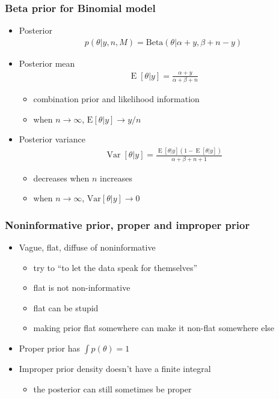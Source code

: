 \documentclass[english,t]{beamer}
\DeclareMathOperator{\E}{E}
\DeclareMathOperator{\Var}{Var}
\begin{document}
\begin{frame}
  \frametitle{Beta prior for Binomial model}

  \begin{itemize}
  \item Posterior
    \baselineskip
    \begin{align*}
      p(\theta|y,n,M) = \text{Beta}(\theta|\alpha+y,\beta+n-y)
    \end{align*}
  \item Posterior mean
    \baselineskip
    \begin{align*}
      \E[\theta|y] = \frac{\alpha+y}{\alpha+\beta+n}
    \end{align*}
    \begin{itemize}
    \item combination prior and likelihood information
    \item when $n\rightarrow\infty$, $\text{E}[\theta|y]\rightarrow y/n$
    \end{itemize}
    \pause
  \item  Posterior variance
    \baselineskip
    \begin{align*}
      \Var[\theta|y]=\frac{\E[\theta|y](1-\E[\theta|y])}{\alpha+\beta+n+1}
    \end{align*}
    \begin{itemize}
    \item decreases when $n$ increases
    \item when $n\rightarrow\infty$, $\text{Var}[\theta|y]\rightarrow 0$
    \end{itemize}      
  \end{itemize}

\end{frame}

\begin{frame}

  \frametitle{Noninformative prior, proper and improper prior}

  \begin{itemize}
  \item Vague, flat, diffuse of noninformative
    \begin{itemize}
    \item try to ``to let the data speak for themselves''
    \item flat is not non-informative
    \item flat can be stupid
    \item making prior flat somewhere can make it non-flat somewhere
      else
    \end{itemize}
  \item Proper prior has $\int p(\theta) = 1$
  \item Improper prior density doesn't have a finite integral
    \begin{itemize}
    \item the posterior can still sometimes be proper
    \end{itemize}
  \end{itemize}
  
\end{frame}
\end{document}
